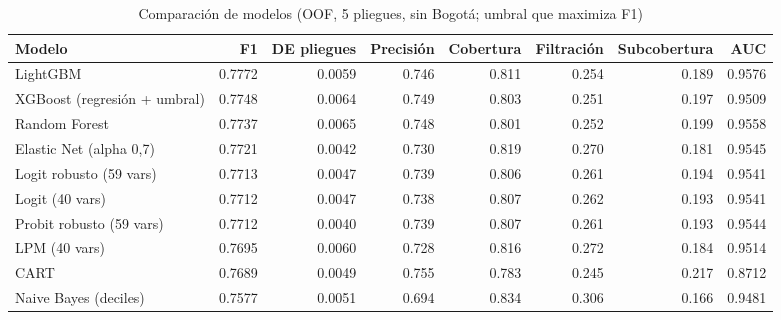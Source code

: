 \begin{table}[ht]
\centering
\begin{tabular}{lrrrrrrr}
  \hline
Modelo & F1 & DE pliegues & Precisión & Cobertura & Filtración & Subcobertura & AUC \\ 
  \hline
LightGBM & 0.7772 & 0.0059 & 0.746 & 0.811 & 0.254 & 0.189 & 0.9576 \\ 
  XGBoost (regresión + umbral) & 0.7748 & 0.0064 & 0.749 & 0.803 & 0.251 & 0.197 & 0.9509 \\ 
  Random Forest & 0.7737 & 0.0065 & 0.748 & 0.801 & 0.252 & 0.199 & 0.9558 \\ 
  Elastic Net (alpha 0,7) & 0.7721 & 0.0042 & 0.730 & 0.819 & 0.270 & 0.181 & 0.9545 \\ 
  Logit robusto (59 vars) & 0.7713 & 0.0047 & 0.739 & 0.806 & 0.261 & 0.194 & 0.9541 \\ 
  Logit (40 vars) & 0.7712 & 0.0047 & 0.738 & 0.807 & 0.262 & 0.193 & 0.9541 \\ 
  Probit robusto (59 vars) & 0.7712 & 0.0040 & 0.739 & 0.807 & 0.261 & 0.193 & 0.9544 \\ 
  LPM (40 vars) & 0.7695 & 0.0060 & 0.728 & 0.816 & 0.272 & 0.184 & 0.9514 \\ 
  CART & 0.7689 & 0.0049 & 0.755 & 0.783 & 0.245 & 0.217 & 0.8712 \\ 
  Naive Bayes (deciles) & 0.7577 & 0.0051 & 0.694 & 0.834 & 0.306 & 0.166 & 0.9481 \\ 
   \hline
\end{tabular}
\caption{Comparación de modelos (OOF, 5 pliegues, sin Bogotá; umbral que maximiza F1)} 
\end{table}
